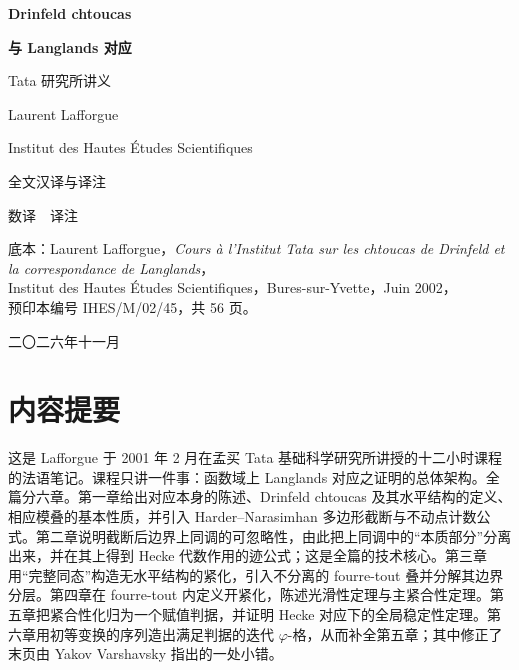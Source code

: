
\begin{titlepage}
\centering
\vspace*{2.2cm}
{\Huge\bfseries\heiti Drinfeld chtoucas\par}
\vspace{0.3cm}
{\Huge\bfseries\heiti 与 Langlands 对应\par}
\vspace{0.9cm}
{\Large\heiti Tata 研究所讲义\par}
\vspace{1.4cm}
{\Large Laurent Lafforgue\par}
\vspace{0.3cm}
{\large Institut des Hautes Études Scientifiques\par}
\vspace{1.2cm}
{\large 全文汉译与译注\par}
\vspace{0.4cm}
{\large 数译\ \ 译注\par}
\vspace{1.6cm}
{\small
底本：Laurent Lafforgue，\emph{Cours à l'Institut Tata sur les chtoucas de Drinfeld et la correspondance de Langlands}，\\
Institut des Hautes Études Scientifiques，Bures-sur-Yvette，Juin 2002，\\
预印本编号 IHES/M/02/45，共 56 页。\par}
\vfill
{\small 二〇二六年十一月\par}
\end{titlepage}

\section*{内容提要}

这是 Lafforgue 于 2001 年 2 月在孟买 Tata 基础科学研究所讲授的十二小时课程的法语笔记。课程只讲一件事：函数域上 Langlands 对应之证明的总体架构。全篇分六章。第一章给出对应本身的陈述、Drinfeld chtoucas 及其水平结构的定义、相应模叠的基本性质，并引入 Harder--Narasimhan 多边形截断与不动点计数公式。第二章说明截断后边界上同调的可忽略性，由此把上同调中的“本质部分”分离出来，并在其上得到 Hecke 代数作用的迹公式；这是全篇的技术核心。第三章用“完整同态”构造无水平结构的紧化，引入不分离的 fourre-tout 叠并分解其边界分层。第四章在 fourre-tout 内定义开紧化，陈述光滑性定理与主紧合性定理。第五章把紧合性化归为一个赋值判据，并证明 Hecke 对应下的全局稳定性定理。第六章用初等变换的序列造出满足判据的迭代 $\varphi$-格，从而补全第五章；其中修正了 \cite{lafforgue98} 末页由 Yakov Varshavsky 指出的一处小错。

